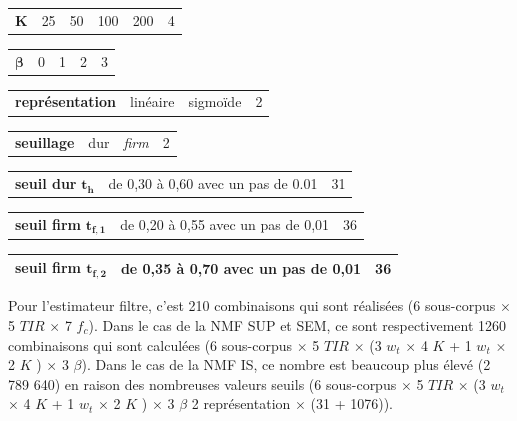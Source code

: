 \begin{table}[h]
\begin{tabularx}{17.5cm}{L{3cm}@{}C{3cm}@{}@{}C{3cm}@{}@{}C{3cm}@{}@{}C{3cm}@{}C{2cm}@{}}
    $\mathbf{K}$ & 25 & 50 & 100 & 200 & 4\\
\end{tabularx}

\begin{tabularx}{17.5cm}{L{3cm}@{}C{4cm}@{}@{}C{4cm}@{}@{}C{4cm}@{}C{2cm}@{}}
   $\mathbf{\beta}$ & 0 & 1 & 2 & 3\\
\end{tabularx}

\begin{tabularx}{17.5cm}{L{3cm}@{}C{6cm}@{}@{}C{6cm}@{}C{2cm}@{}}
   \textbf{représentation} & linéaire & sigmoïde & 2\\
\end{tabularx}

\begin{tabularx}{17.5cm}{L{3cm}@{}C{6cm}@{}@{}C{6cm}@{}C{2cm}@{}}
   \textbf{seuillage} & dur & \textit{firm} & 2\\
\end{tabularx}

\begin{tabularx}{17.5cm}{L{3cm}@{}C{12cm}@{}C{2cm}@{}}
	\textbf{seuil dur} $\mathbf{t_h}$ & de 0,30 à 0,60 avec un pas de 0.01 & 31\\
\end{tabularx}

\begin{tabularx}{17.5cm}{L{3cm}@{}C{12cm}@{}C{2cm}@{}}
   \textbf{seuil firm} $\mathbf{t_{f,1}}$ & de 0,20 à 0,55 avec un pas de 0,01 & 36\\
\end{tabularx}

\begin{tabularx}{17.5cm}{L{3cm}@{}C{12cm}@{}C{2cm}@{}}
   \textbf{seuil firm} $\mathbf{t_{f,2}}$ & de 0,35 à 0,70 avec un pas de 0,01 & 36\\
   \bottomrule
\end{tabularx}
\label{tab:experimental_factorsNMF_ambiance}
\end{table}

Pour l'estimateur filtre, c'est 210 combinaisons qui sont réalisées (6 sous-corpus $\times$ 5 $TIR$ $\times$ 7 $f_c$). Dans le cas de la NMF SUP et SEM, ce sont respectivement 1260 combinaisons qui sont calculées (6 sous-corpus $\times$ 5 $TIR$ $\times$ (3 $w_t$ $\times$ 4 $K$ + 1 $w_t$ $\times$ 2 $K$ ) $\times$ 3 $\beta$). Dans le cas de la NMF IS, ce nombre est beaucoup plus élevé (2 789 640) en raison des nombreuses valeurs seuils (6 sous-corpus $\times$ 5 $TIR$ $\times$ (3 $w_t$ $\times$ 4 $K$ + 1 $w_t$ $\times$ 2 $K$ ) $\times$ 3 $\beta$ 2 représentation $\times$ (31 + 1076)).

